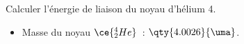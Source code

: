 Calculer l'énergie de liaison du noyau d'hélium 4.

\begin{donnees}
    \begin{itemize}
      \item Masse du noyau $\ce{_{2}^{4}He}$~: $\qty{4.0026}{\uma}$.
    \end{itemize}
\end{donnees}


